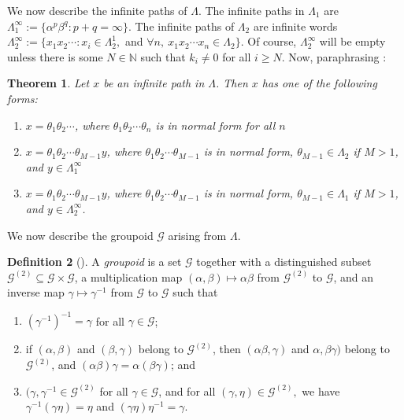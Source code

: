 \documentclass[12pt]{amsart}
\newcommand{\sse}{\subseteq}
\newcommand{\mc}[1]{\mathcal{#1}}
\newcommand{\N}{\mathbb{N}}
\newcommand{\al}{\alpha}
\newcommand{\be}{\beta}
\newcommand{\ga}{\gamma}
\theoremstyle{plain} %
\newtheorem{Theorem}{Theorem}[section]
\theoremstyle{definition} %
\newtheorem{Definition}[Theorem]{Definition}
\begin{document}
We now describe the infinite paths of $\Lambda$. The infinite paths in $\Lambda_1$ are $\Lambda_1^{\infty} := \{ \alpha^p\beta^q : p+q = \infty\}$. The infinite paths of $\Lambda_2$ are infinite words $\Lambda_2^{\infty} := \{x_1 x_2 \cdots : x_i \in \Lambda_2^1,$ and $\forall n, \ x_1 x_2 \cdots x_n \in \Lambda_2\}.$ Of course, $\Lambda_2^{\infty}$ will be empty unless there is some $N \in \N$ such that $k_i \neq 0$ for all $i \geq N$. Now, paraphrasing  \cite[Theorem 3.9]{MS22}:
\begin{Theorem}
    Let $x$ be an infinite path in $\Lambda$. Then $x$ has one of the following forms:
    \begin{enumerate}[(1)]
        \item $x = \theta_1 \theta_2 \cdots$, where $\theta_1 \theta_2 \cdots \theta_n$ is in normal form for all $n$

        \item $x = \theta_1 \theta_2 \cdots \theta_{M-1} y$, where $\theta_1 \theta_2 \cdots \theta_{M-1}$ is in normal form, $\theta_{M-1} \in \Lambda_2$ if $M>1$, and $y \in \Lambda_1^{\infty}$

        \item $x = \theta_1 \theta_2 \cdots \theta_{M-1} y$, where $\theta_1 \theta_2 \cdots \theta_{M-1}$ is in normal form, $\theta_{M-1} \in \Lambda_1$ if $M>1$, and $y \in \Lambda_2^{\infty}$.
    \end{enumerate}
\end{Theorem}



We now describe the groupoid $\mc{G}$ arising from $\Lambda$. 

\begin{Definition}[\cite{Sims18}]
    A \textit{groupoid} is a set $\mc{G}$ together with a distinguished subset $\mc{G}^{(2)} \sse \mc{G} \times \mc{G}$, a multiplication map $(\al, \be) \mapsto \al \be$ from $\mc{G}^{(2)}$ to $\mc{G}$, and an inverse map $\ga \mapsto \ga^{-1}$ from $\mc{G}$ to $\mc{G}$ such that
    \begin{enumerate}[(1)]
        \item $(\ga^{-1})^{-1}= \ga$ for all $\ga \in \mc{G}$;
        \item if $(\al, \be)$ and $(\be, \ga)$ belong to $\mc{G}^{(2)}$, then $(\al \be, \ga)$ and $\al, \be \ga)$ belong to $\mc{G}^{(2)}$, and $(\al \be) \ga = \al (\be \ga)$; and

        \item $(\ga, \ga^{-1} \in \mc{G}^{(2)}$ for all $\ga \in \mc{G}$, and for all $(\ga, \eta) \in \mc{G}^{(2)},$ we have $\ga^{-1} (\ga \eta) = \eta$ and $(\ga \eta) \eta^{-1} = \ga$.
    \end{enumerate}
\end{Definition}
\end{document}
